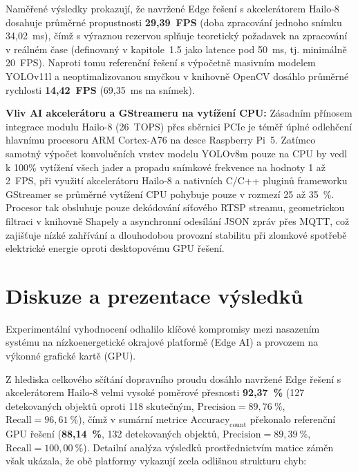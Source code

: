 \documentclass[male,czech,api_bc]{kitheses}
\begin{document}
Naměřené výsledky prokazují, že navržené Edge řešení s akcelerátorem Hailo-8 dosahuje průměrné propustnosti \textbf{29,39~FPS} (doba zpracování jednoho snímku 34,02~ms), čímž s výraznou rezervou splňuje teoretický požadavek na zpracování v reálném čase (definovaný v kapitole~1.5 jako latence pod 50~ms, tj. minimálně 20~FPS). Naproti tomu referenční řešení s výpočetně masivním modelem YOLOv11l a neoptimalizovanou smyčkou v knihovně OpenCV dosáhlo průměrné rychlosti \textbf{14,42~FPS} (69,35~ms na snímek).

\textbf{Vliv AI akcelerátoru a GStreameru na vytížení CPU:}
Zásadním přínosem integrace modulu Hailo-8 (26~TOPS) přes sběrnici PCIe je téměř úplné odlehčení hlavnímu procesoru ARM Cortex-A76 na desce Raspberry Pi~5. Zatímco samotný výpočet konvolučních vrstev modelu YOLOv8m pouze na CPU by vedl k 100\% vytížení všech jader a propadu snímkové frekvence na hodnoty 1 až 2~FPS, při využití akcelerátoru Hailo-8 a nativních C/C++ pluginů frameworku GStreamer se průměrné vytížení CPU pohybuje pouze v rozmezí 25 až 35~\%. Procesor tak obsluhuje pouze dekódování síťového RTSP streamu, geometrickou filtraci v knihovně Shapely a asynchronní odesílání JSON zpráv přes MQTT, což zajišťuje nízké zahřívání a dlouhodobou provozní stabilitu při zlomkové spotřebě elektrické energie oproti desktopovému GPU řešení.

\chapter{Diskuze a prezentace výsledků}
Experimentální vyhodnocení odhalilo klíčové kompromisy mezi nasazením systému na nízkoenergetické okrajové platformě (Edge AI) a provozem na výkonné grafické kartě (GPU).

Z hlediska celkového sčítání dopravního proudu dosáhlo navržené Edge řešení s akcelerátorem Hailo-8 velmi vysoké poměrové přesnosti \textbf{92,37~\%} (127 detekovaných objektů oproti 118 skutečným, $\text{Precision} = 89{,}76~\%$, $\text{Recall} = 96{,}61~\%$), čímž v sumární metrice $\text{Accuracy}_{\text{count}}$ překonalo referenční GPU řešení (\textbf{88,14~\%}, 132 detekovaných objektů, $\text{Precision} = 89{,}39~\%$, $\text{Recall} = 100{,}00~\%$). Detailní analýza výsledků prostřednictvím matice záměn však ukázala, že obě platformy vykazují zcela odlišnou strukturu chyb:
\end{document}
